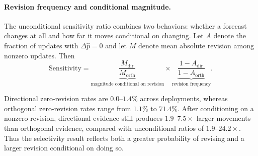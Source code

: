 \paragraph{Revision frequency and conditional magnitude.}

The unconditional sensitivity ratio combines two behaviors: whether a forecast changes at all and how far it moves conditional on changing.
Let $A$ denote the fraction of updates with $\Delta\hat p=0$ and let $M$ denote mean absolute revision among nonzero updates.
Then
\begin{equation}
\mathrm{Sensitivity}
=
\underbrace{\frac{M_{\mathrm{dir}}}{M_{\mathrm{orth}}}}_{\text{magnitude conditional on revision}}
\times
\underbrace{\frac{1-A_{\mathrm{dir}}}{1-A_{\mathrm{orth}}}}_{\text{revision frequency}}.
\label{eq:sensitivity-decomposition}
\end{equation}

Directional zero-revision rates are $0.0$--$1.4\%$ across deployments, whereas orthogonal zero-revision rates range from $1.1\%$ to $71.4\%$.
After conditioning on a nonzero revision, directional evidence still produces $1.9$--$7.5\times$ larger movements than orthogonal evidence, compared with unconditional ratios of $1.9$--$24.2\times$.
Thus the selectivity result reflects both a greater probability of revising and a larger revision conditional on doing so.

